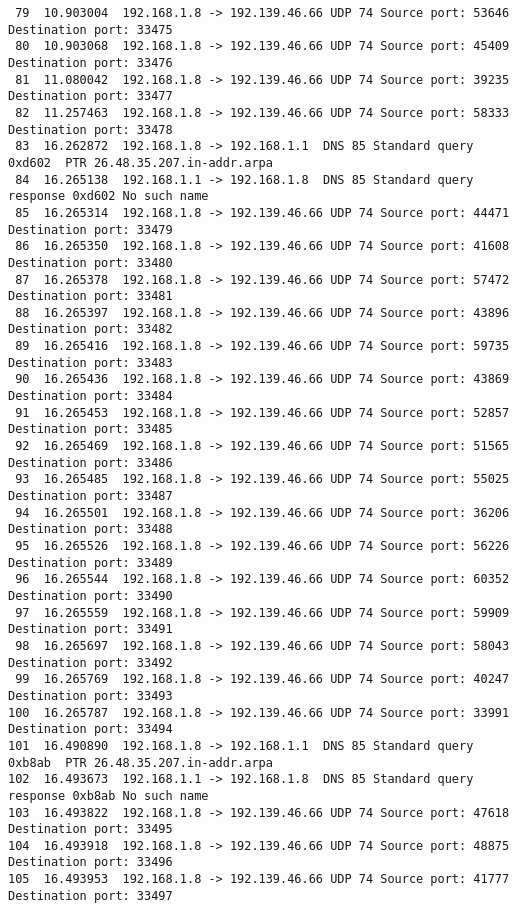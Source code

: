 \documentclass[a4paper]{report} %
\begin{document}
\begin{lstlisting}
 79  10.903004  192.168.1.8 -> 192.139.46.66 UDP 74 Source port: 53646  Destination port: 33475
 80  10.903068  192.168.1.8 -> 192.139.46.66 UDP 74 Source port: 45409  Destination port: 33476
 81  11.080042  192.168.1.8 -> 192.139.46.66 UDP 74 Source port: 39235  Destination port: 33477
 82  11.257463  192.168.1.8 -> 192.139.46.66 UDP 74 Source port: 58333  Destination port: 33478
 83  16.262872  192.168.1.8 -> 192.168.1.1  DNS 85 Standard query 0xd602  PTR 26.48.35.207.in-addr.arpa
 84  16.265138  192.168.1.1 -> 192.168.1.8  DNS 85 Standard query response 0xd602 No such name
 85  16.265314  192.168.1.8 -> 192.139.46.66 UDP 74 Source port: 44471  Destination port: 33479
 86  16.265350  192.168.1.8 -> 192.139.46.66 UDP 74 Source port: 41608  Destination port: 33480
 87  16.265378  192.168.1.8 -> 192.139.46.66 UDP 74 Source port: 57472  Destination port: 33481
 88  16.265397  192.168.1.8 -> 192.139.46.66 UDP 74 Source port: 43896  Destination port: 33482
 89  16.265416  192.168.1.8 -> 192.139.46.66 UDP 74 Source port: 59735  Destination port: 33483
 90  16.265436  192.168.1.8 -> 192.139.46.66 UDP 74 Source port: 43869  Destination port: 33484
 91  16.265453  192.168.1.8 -> 192.139.46.66 UDP 74 Source port: 52857  Destination port: 33485
 92  16.265469  192.168.1.8 -> 192.139.46.66 UDP 74 Source port: 51565  Destination port: 33486
 93  16.265485  192.168.1.8 -> 192.139.46.66 UDP 74 Source port: 55025  Destination port: 33487
 94  16.265501  192.168.1.8 -> 192.139.46.66 UDP 74 Source port: 36206  Destination port: 33488
 95  16.265526  192.168.1.8 -> 192.139.46.66 UDP 74 Source port: 56226  Destination port: 33489
 96  16.265544  192.168.1.8 -> 192.139.46.66 UDP 74 Source port: 60352  Destination port: 33490
 97  16.265559  192.168.1.8 -> 192.139.46.66 UDP 74 Source port: 59909  Destination port: 33491
 98  16.265697  192.168.1.8 -> 192.139.46.66 UDP 74 Source port: 58043  Destination port: 33492
 99  16.265769  192.168.1.8 -> 192.139.46.66 UDP 74 Source port: 40247  Destination port: 33493
100  16.265787  192.168.1.8 -> 192.139.46.66 UDP 74 Source port: 33991  Destination port: 33494
101  16.490890  192.168.1.8 -> 192.168.1.1  DNS 85 Standard query 0xb8ab  PTR 26.48.35.207.in-addr.arpa
102  16.493673  192.168.1.1 -> 192.168.1.8  DNS 85 Standard query response 0xb8ab No such name
103  16.493822  192.168.1.8 -> 192.139.46.66 UDP 74 Source port: 47618  Destination port: 33495
104  16.493918  192.168.1.8 -> 192.139.46.66 UDP 74 Source port: 48875  Destination port: 33496
105  16.493953  192.168.1.8 -> 192.139.46.66 UDP 74 Source port: 41777  Destination port: 33497

\end{lstlisting}
\end{document}

